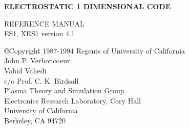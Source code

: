 \pagestyle{plain}
\textheight 9.4in
\addtolength{\oddsidemargin}{-0.7in}
\addtolength{\textwidth}{1.2in}
\topmargin -0.3in
\headheight 0.1in
\headsep 0.1in


\begin{center}
\Huge
{}

\vspace{-.4in}

\Large
{\bf ELECTROSTATIC 1 DIMENSIONAL CODE}

\vspace{0.3in}
REFERENCE MANUAL \\
ES1, XES1 version 4.1

\begin{figure}[h]
\vspace{4.9in}
\end{figure}

\normalsize
\copyright Copyright 1987-1994 Regents of University of California \\
John P. Verboncoeur\\
Vahid Vahedi\\
c/o Prof. C. K. Birdsall\\
Plasma Theory and Simulation Group\\
Electronics Research Laboratory, Cory Hall\\
University of California\\
Berkeley, CA 94720

\end{center}

\newpage
\tableofcontents

